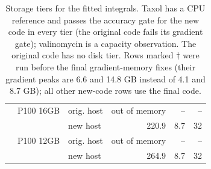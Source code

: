 \begin{table}[!htbp]
{\begin{tabular}{lllrrr}
 & P100 16GB & orig. host & out of memory & -- & -- \\
 &  & new host & 220.9 & 8.7 & 32 \\
 & P100 12GB & orig. host & out of memory & -- & -- \\
 &  & new host & 264.9 & 8.7 & 32 \\
\bottomrule
\end{tabular}}
\caption{Storage tiers for the fitted integrals. Taxol has a CPU reference and passes the accuracy gate for the new code in every tier (the original code fails its gradient gate); valinomycin is a capacity observation. The original code has no disk tier. Rows marked $\dagger$ were run before the final gradient-memory fixes (their gradient peaks are 6.6 and 14.8 GB instead of 4.1 and 8.7 GB); all other new-code rows use the final code.}
\label{tab:storage}
\end{table}
